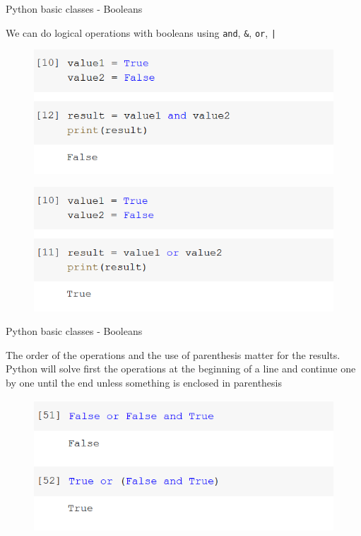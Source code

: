 \documentclass[aspectratio=169]{beamer}
\begin{document}
\begin{frame}{Python basic classes - Booleans}

	We can do logical operations with booleans using \texttt{and}, \texttt{\&}, \texttt{or}, \texttt{|}

	\begin{multicols}{2}

		\begin{figure}
			\centering
			\includegraphics[width=0.8\linewidth]{img/and.png}
		\end{figure}
		\begin{figure}
			\centering
			\includegraphics[width=0.8\linewidth]{img/or.png}
		\end{figure}

	\end{multicols}


\end{frame}

\begin{frame}{Python basic classes - Booleans}

	The order of the operations and the use of parenthesis matter for the results. Python will solve first the operations at the beginning of a line and continue one by one until the end unless something is enclosed in parenthesis

	\begin{figure}
		\centering
		\includegraphics[width=0.6\linewidth]{img/bool_operations.png}
	\end{figure}

\end{frame}
\end{document}
